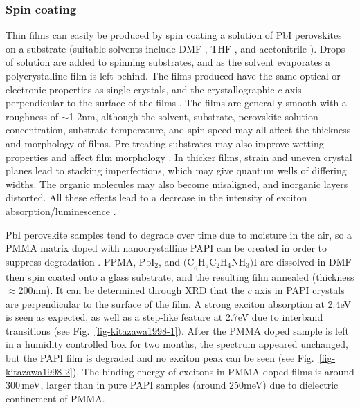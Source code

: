 \subsubsection{Spin coating}
Thin films can easily be produced by spin coating a solution of PbI perovskites on a substrate (suitable solvents include DMF \cite{Kikuchi2005}, THF \cite{Kataoka1994}, and acetonitrile \cite{Prakash2009}). Drops of solution are added to spinning substrates, and as the solvent evaporates a polycrystalline film is left behind. The films produced have the same optical or electronic properties as single crystals, and the crystallographic $c$ axis perpendicular to the surface of the films \cite{Kataoka1993}. The films are generally smooth with a roughness of $\sim$1-2nm, although the solvent, substrate, perovskite solution concentration, substrate temperature, and spin speed may all affect the thickness and morphology of films. Pre-treating substrates may also improve wetting properties and affect film morphology \cite{Mitzi2001b}. In thicker films, strain and uneven crystal planes lead to stacking imperfections, which may give quantum wells of differing widths. The organic molecules may also become misaligned, and inorganic layers distorted. All these effects lead to a decrease in the intensity of exciton absorption/luminescence \cite{Prakash2009}.

PbI perovskite samples tend to degrade over time due to moisture in the air, so a PMMA matrix doped with nanocrystalline PAPI can be created in order to suppress degradation \cite{Kitazawa1998}. PPMA, Pb$\textrm{I}_2$, and $\textrm{(C}_6\textrm{H}_9\textrm{C}_2\textrm{H}_4\textrm{NH}_3)\textrm{I}$ are dissolved in DMF then spin coated onto a glass substrate, and the resulting film annealed (thickness $\approx$200nm). It can be determined through XRD that the $c$ axis in PAPI crystals are perpendicular to the surface of the film. A strong exciton absorption at 2.4eV is seen as expected, as well as a step-like feature at 2.7eV due to interband transitions (see Fig.\ \ref{fig-kitazawa1998-1}). After the PMMA doped sample is left in a humidity controlled box for two months, the spectrum appeared unchanged, but the PAPI film is degraded and no exciton peak can be seen (see Fig.\ \ref{fig-kitazawa1998-2}).  The binding energy of excitons in PMMA doped films is around 300\,meV, larger than in pure PAPI samples (around 250meV) due to dielectric confinement of PMMA. 

